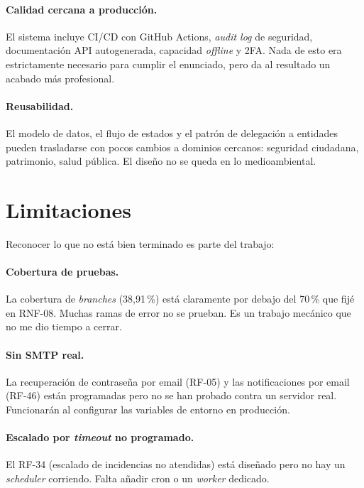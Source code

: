 \paragraph{Calidad cercana a producción.}  El sistema incluye CI/CD con GitHub Actions, \textit{audit log} de seguridad, documentación API autogenerada, capacidad \textit{offline} y 2FA. Nada de esto era estrictamente necesario para cumplir el enunciado, pero da al resultado un acabado más profesional.

\paragraph{Reusabilidad.}  El modelo de datos, el flujo de estados y el patrón de delegación a entidades pueden trasladarse con pocos cambios a dominios cercanos: seguridad ciudadana, patrimonio, salud pública. El diseño no se queda en lo medioambiental.


\section{Limitaciones}
\label{sec:limitaciones}

Reconocer lo que no está bien terminado es parte del trabajo:

\paragraph{Cobertura de pruebas.}  La cobertura de \textit{branches} (38{,}91\,\%) está claramente por debajo del 70\,\% que fijé en RNF-08. Muchas ramas de error no se prueban. Es un trabajo mecánico que no me dio tiempo a cerrar.

\paragraph{Sin SMTP real.}  La recuperación de contraseña por email (RF-05) y las notificaciones por email (RF-46) están programadas pero no se han probado contra un servidor real. Funcionarán al configurar las variables de entorno en producción.

\paragraph{Escalado por \textit{timeout} no programado.}  El RF-34 (escalado de incidencias no atendidas) está diseñado pero no hay un \textit{scheduler} corriendo. Falta añadir cron o un \textit{worker} dedicado.

